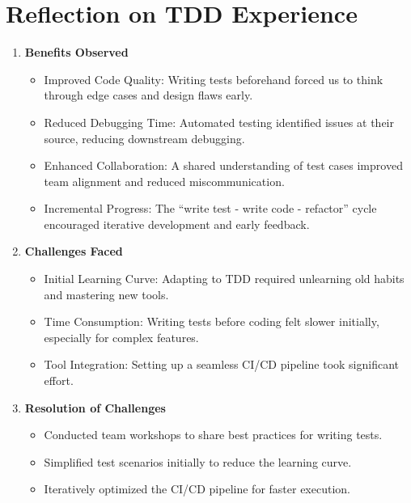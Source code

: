 \documentclass[a4paper,12pt]{article}
\begin{document}
\section{Reflection on TDD Experience}
\begin{enumerate}
    \item \textbf{Benefits Observed}
        \begin{itemize}
            \item Improved Code Quality: Writing tests beforehand forced us to think through edge cases and
                design flaws early.
            \item Reduced Debugging Time: Automated testing identified issues at their source, reducing
                downstream debugging.
            \item Enhanced Collaboration: A shared understanding of test cases improved team alignment and
                reduced miscommunication.
            \item Incremental Progress: The “write test - write code - refactor” cycle encouraged iterative
                development and early feedback.
    \end{itemize}
    \item \textbf{Challenges Faced}
        \begin{itemize}
            \item Initial Learning Curve: Adapting to TDD required unlearning old habits and mastering new
                tools.
            \item Time Consumption: Writing tests before coding felt slower initially, especially for complex
                features.
            \item Tool Integration: Setting up a seamless CI/CD pipeline took significant effort.
    \end{itemize}
    \item \textbf{Resolution of Challenges}
        \begin{itemize}
            \item Conducted team workshops to share best practices for writing tests.
            \item Simplified test scenarios initially to reduce the learning curve.
            \item Iteratively optimized the CI/CD pipeline for faster execution.
    \end{itemize}
\end{enumerate}
\end{document}
